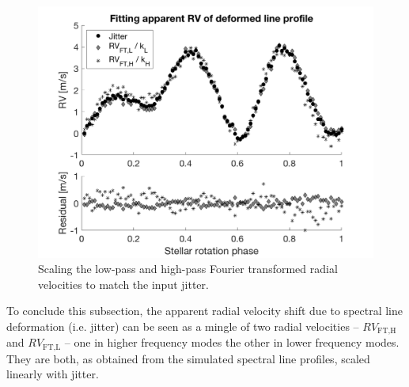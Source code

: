 \begin{figure}[tbp]
\centering
\includegraphics[width = 0.7 \linewidth]
{./Figures/Methods/5-JITTER_ONLY_4.png}
\caption[Scaling the low-pass and high-pass Fourier transformed radial velocities]
{Scaling the low-pass and high-pass Fourier transformed radial velocities to match the input jitter.}
\label{fig:scaling_RV_FT}
\end{figure} 

To conclude this subsection, the apparent radial velocity shift due to spectral line deformation (i.e. jitter) can be seen as a mingle of two radial velocities -- $RV_\text{FT,H}$ and $RV_\text{FT,L}$ -- one in higher frequency modes the other in lower frequency modes. They are both, as obtained from the simulated spectral line profiles, scaled linearly with jitter.

%
%
%
%

